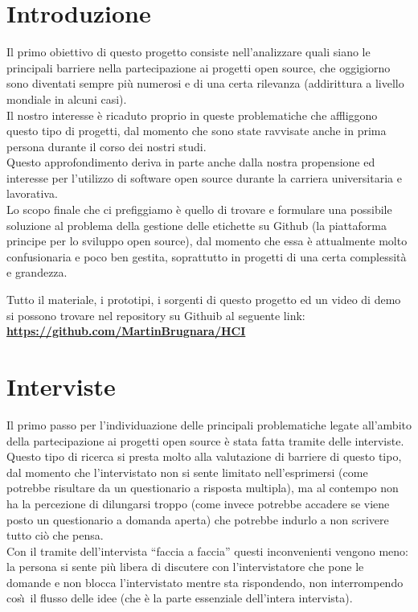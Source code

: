 \documentclass[12pt]{article} %
\begin{document}
\section{Introduzione}
Il primo obiettivo di questo progetto consiste nell'analizzare quali siano le principali barriere nella partecipazione ai progetti open source, che oggigiorno sono diventati sempre pi\`u numerosi e di una certa rilevanza (addirittura a livello mondiale in alcuni casi).\\
Il nostro interesse \`e ricaduto proprio in queste problematiche che affliggono questo tipo di progetti, dal momento che sono state ravvisate anche in prima persona durante il corso dei nostri studi.\\
Questo approfondimento deriva in parte anche dalla nostra propensione ed interesse per l'utilizzo di software open source durante la carriera universitaria e lavorativa.\\
Lo scopo finale che ci prefiggiamo \`e quello di trovare e formulare una possibile soluzione al problema della gestione delle etichette su Github (la piattaforma principe per lo sviluppo open source), dal momento che essa \`e attualmente molto confusionaria e poco ben gestita, soprattutto in progetti di una certa complessit\`a e grandezza.\\
\vfill
\begin{center}
Tutto il materiale, i prototipi, i sorgenti di questo progetto ed un video di demo si possono trovare nel repository su Githuib al seguente link:\\
\textbf{\url{https://github.com/MartinBrugnara/HCI}}
\end{center}

\newpage

\section{Interviste}
Il primo passo per l'individuazione delle principali problematiche legate all'ambito della partecipazione ai progetti open source \`e stata fatta tramite delle interviste. Questo tipo di ricerca si presta molto alla valutazione di barriere di questo tipo, dal momento che l'intervistato non si sente limitato nell'esprimersi (come potrebbe risultare da un questionario a risposta multipla), ma al contempo non ha la percezione di dilungarsi troppo (come invece potrebbe accadere se viene posto un questionario a domanda aperta) che potrebbe indurlo a non scrivere tutto ci\`o che pensa.\\
Con il tramite dell'intervista ``faccia a faccia'' questi inconvenienti vengono meno: la persona si sente pi\`u libera di discutere con l'intervistatore che pone le domande e non blocca l'intervistato mentre sta rispondendo, non interrompendo cos\`\i\ il flusso delle idee (che \`e la parte essenziale dell'intera intervista).\\
\end{document}
